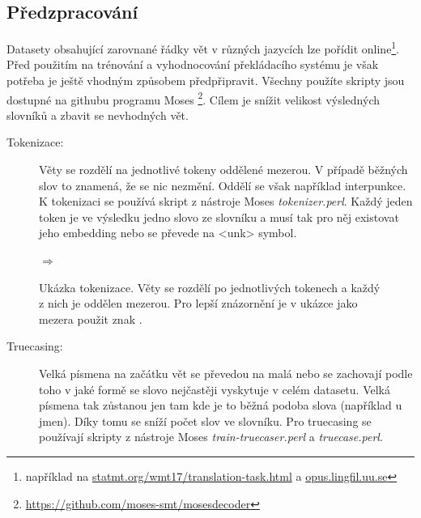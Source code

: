 \subsection{Předzpracování} \label{subsection:preparing}

Datasety obsahující zarovnané řádky vět v různých jazycích lze pořídit online\footnote{například na \url{statmt.org/wmt17/translation-task.html} a \url{opus.lingfil.uu.se}}. Před použitím na trénování a vyhodnocování překládacího systému je však potřeba je ještě vhodným způsobem předpřipravit. Všechny použíte skripty jsou dostupné na githubu programu Moses \footnote{\url{https://github.com/moses-smt/mosesdecoder}}. Cílem je snížit velikost výsledných slovníků a zbavit se nevhodných vět.

\begin{description}
  \item[Tokenizace:] Věty se rozdělí na jednotlivé tokeny oddělené mezerou. V případě běžných slov to znamená, že se nic nezmění. Oddělí se však například interpunkce. K tokenizaci se používá skript z nástroje Moses \emph{tokenizer.perl}. Každý jeden token je ve výsledku jedno slovo ze slovníku a musí tak pro něj existovat jeho embedding nebo se převede na <unk> symbol.
\end{description}

\begin{figure}[H]
    \begin{center}
     \setlength{\fboxsep}{8pt}
        $\Longrightarrow$
        \setlength{\fboxsep}{8pt}
    \end{center}
	\caption{Ukázka tokenizace. Věty se rozdělí po jednotlivých tokenech a každý z nich je oddělen mezerou. Pro lepší znázornění je v ukázce jako mezera použit znak \uv{\textvisiblespace}.}
	\label{img:tokenization}
\end{figure}


\begin{description}
  \item[Truecasing:] Velká písmena na začátku vět se převedou na malá nebo se zachovají podle toho v jaké formě se slovo nejčastěji vyskytuje v celém datasetu. Velká písmena tak zůstanou jen tam kde je to běžná podoba slova (například u jmen). Díky tomu se sníží počet slov ve slovníku. Pro truecasing se používají skripty z nástroje Moses \emph{train-truecaser.perl} a \emph{truecase.perl}.
\end{description}


